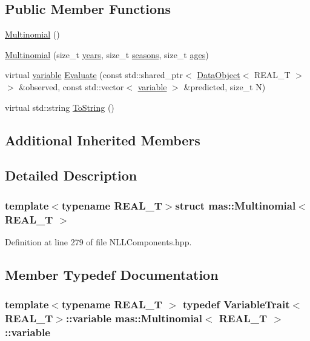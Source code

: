 \subsection*{Public Member Functions}
\begin{DoxyCompactItemize}
\item 
\hyperlink{structmas_1_1_multinomial_ab96a958b976586557b7133911c3c2e01}{Multinomial} ()
\item 
\hyperlink{structmas_1_1_multinomial_ae285e7754e5db741e7c251e0f87d6b08}{Multinomial} (size\-\_\-t \hyperlink{structmas_1_1_n_l_l_functor_ac76e5d7e0808486b42ffdaea952dd19f}{years}, size\-\_\-t \hyperlink{structmas_1_1_n_l_l_functor_ac59c36239b1817b5bb357bf90dc4802d}{seasons}, size\-\_\-t \hyperlink{structmas_1_1_n_l_l_functor_aa70e461c812bff95770cda5dbb79b6b9}{ages})
\item 
virtual \hyperlink{structmas_1_1_model_object_a4e62fdbb5826f8fac311262b888ab10a}{variable} \hyperlink{structmas_1_1_multinomial_aaa2e60866cb5693bf048f09480547da4}{Evaluate} (const std\-::shared\-\_\-ptr$<$ \hyperlink{structmas_1_1_data_object}{Data\-Object}$<$ R\-E\-A\-L\-\_\-\-T $>$ $>$ \&observed, const std\-::vector$<$ \hyperlink{structmas_1_1_model_object_a4e62fdbb5826f8fac311262b888ab10a}{variable} $>$ \&predicted, size\-\_\-t N)
\item 
virtual std\-::string \hyperlink{structmas_1_1_multinomial_a90903904b06f2e5a79ffba4981fef34a}{To\-String} ()
\end{DoxyCompactItemize}
\subsection*{Additional Inherited Members}


\subsection{Detailed Description}
\subsubsection*{template$<$typename R\-E\-A\-L\-\_\-\-T$>$struct mas\-::\-Multinomial$<$ R\-E\-A\-L\-\_\-\-T $>$}



Definition at line 279 of file N\-L\-L\-Components.\-hpp.



\subsection{Member Typedef Documentation}
\hypertarget{structmas_1_1_multinomial_a3d7e943ca6b28c275046a26559ce8efe}{
\subsubsection[{variable}]{\setlength{\rightskip}{0pt plus 5cm}template$<$typename R\-E\-A\-L\-\_\-\-T $>$ typedef {\bf Variable\-Trait}$<$R\-E\-A\-L\-\_\-\-T$>$\-::{\bf variable} {\bf mas\-::\-Multinomial}$<$ R\-E\-A\-L\-\_\-\-T $>$\-::{\bf variable}}}\label{structmas_1_1_multinomial_a3d7e943ca6b28c275046a26559ce8efe}


